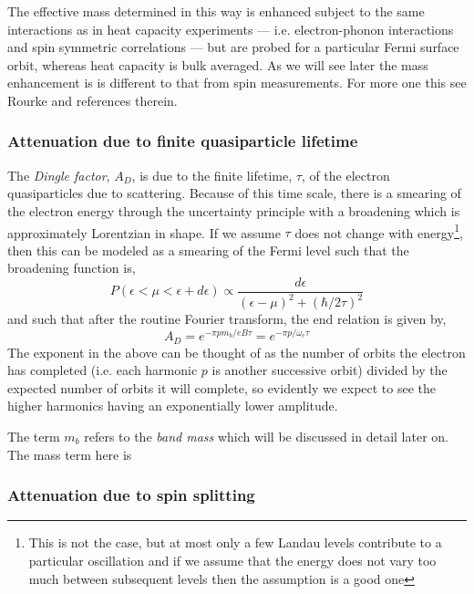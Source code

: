 The effective mass determined in this way is enhanced subject to the same interactions as in heat capacity experiments --- i.e. electron-phonon interactions and spin symmetric correlations --- but are probed for a particular Fermi surface orbit, whereas heat capacity is bulk averaged. As we will see later the mass enhancement is is different to that from spin measurements. For more one this see Rourke \etal\cite{Rourke2010b} and references therein.

\subsubsection{Attenuation due to finite quasiparticle lifetime}

The \textit{Dingle factor}, $A_D$, is due to the finite lifetime, $\tau$, of the electron quasiparticles due to scattering. Because of this time scale, there is a smearing of the electron energy through the uncertainty principle with a broadening which is approximately Lorentzian in shape. If we assume $\tau$ does not change with energy\footnote{This is not the case, but at most only a few Landau levels contribute to a particular oscillation and if we assume that the energy does not vary too much between subsequent levels then the assumption is a good one}, then this can be modeled as a smearing of the Fermi level such that the broadening function is,
\begin{equation}
  P(\epsilon < \mu < \epsilon + d\epsilon) \propto \frac{d\epsilon}{(\epsilon - \mu)^2 + (\hbar/2\tau)^2}
\end{equation}
and such that after the routine Fourier transform, the end relation is given by,
\begin{equation}
  A_D = e^{-\pi p m_b/e B\tau} = e^{-\pi p/\omega_c\tau} 
\label{Eqn:Theo:DingleTerm}
\end{equation}
The exponent in the above can be thought of as the number of orbits the electron has completed (i.e. each harmonic $p$ is another successive orbit) divided by the expected number of orbits it will complete, so evidently we expect to see the higher harmonics having an exponentially lower amplitude.

The term $m_b$ refers to the \textit{band mass} which will be discussed in detail later on. The mass term here is 

\subsubsection{Attenuation due to spin splitting}

